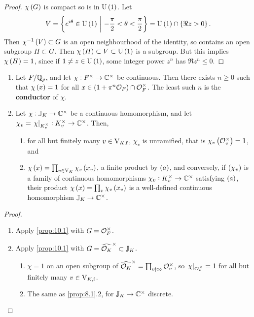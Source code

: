 \begin{proof}
$ \chi\br{G} $ is compact so is in $ \U\br{1} $. Let
$$ V = \cbr{e^{i\theta} \in \U\br{1} \st -\dfrac{\pi}{2} < \theta < \dfrac{\pi}{2}} = \U\br{1} \cap \cbr{\Re z > 0}. $$
Then $ \chi^{-1}\br{V} \subset G $ is an open neighbourhood of the identity, so contains an open subgroup $ H \subset G $. Then $ \chi\br{H} \subset V \subset \U\br{1} $ is a subgroup. But this implies $ \chi\br{H} = 1 $, since if $ 1 \ne z \in \U\br{1} $, some integer power $ z^n $ has $ \Re z^n \le 0 $.
\end{proof}


\begin{corollary}
\label{cor:10.2}
\hfill
\begin{enumerate}
\item Let $ F / \mathbb{Q}_p $, and let $ \chi : F^\times \to \mathbb{C}^\times $ be continuous. Then there exists $ n \ge 0 $ such that $ \chi\br{x} = 1 $ for all $ x \in \br{1 + \pi^n\OOO_F} \cap \OOO_F^\times $. The least such $ n $ is the \textbf{conductor} of $ \chi $.
\item Let $ \chi : \mathbb{J}_K \to \mathbb{C}^\times $ be a continuous homomorphism, and let $ \chi_v = \left. \chi \right|_{K_v^\times} : K_v^\times \to \mathbb{C}^\times $. Then,
\begin{enumerate}
\item for all but finitely many $ v \in \mathrm{V}_{K, \mathrm{f}} $, $ \chi_v $ is unramified, that is $ \chi_v\br{\OOO_v^\times} = 1 $, and
\item $ \chi\br{x} = \prod_{v \in \V_K} \chi_v\br{x_v} $, a finite product by $ \br{a} $, and conversely, if $ \br{\chi_v} $ is a family of continuous homomorphisms $ \chi_v : K_v^\times \to \mathbb{C}^\times $ satisfying $ \br{a} $, their product $ \chi\br{x} = \prod_v \chi_v\br{x_v} $ is a well-defined continuous homomorphism $ \mathbb{J}_K \to \mathbb{C}^\times $.
\end{enumerate}
\end{enumerate}
\end{corollary}

\pagebreak

\begin{proof}
\hfill
\begin{enumerate}
\item Apply \ref{prop:10.1} with $ G = \mathcal{O}_F^\times $.
\item Apply \ref{prop:10.1} with $ G = \widehat{\mathcal{O}_K}^\times \subset \mathbb{J}_K $.
\begin{enumerate}
\item $ \chi = 1 $ on an open subgroup of $ \widehat{\mathcal{O}_K}^\times = \prod_{v \nmid \infty} \mathcal{O}_v^\times $, so $ \left. \chi \right|_{\mathcal{O}_v^\times} = 1 $ for all but finitely many $ v \in \mathrm{V}_{K, \mathrm{f}} $.
\item The same as \ref{prop:8.1}.$ 2 $, for $ \mathbb{J}_K \to \mathbb{C}^\times $ discrete.
\end{enumerate}
\end{enumerate}
\end{proof}

